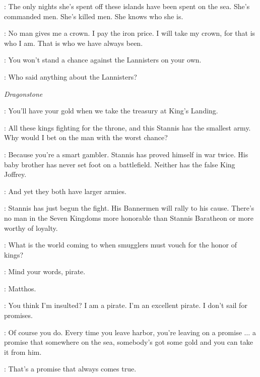 \BALON: The only nights she's spent off these islands have been spent on the sea. She's commanded men. She's killed men. She knows who she is.


\BALON: No man gives me a crown. I pay the iron price. I will take my crown, for that is who I am. That is who we have always been.


\THEON: You won't stand a chance against the Lannisters on your own.

\BALON: Who said anything about the Lannisters?


\scene

\textit{Dragonstone}


\DAVOS: You'll have your gold when we take the treasury at King's Landing.

\SALLADHOR: All these kings fighting for the throne, and this Stannis has the smallest army. Why would I bet on the man with the worst chance?

\DAVOS: Because you're a smart gambler. Stannis has proved himself in war twice. His baby brother has never set foot on a battlefield. Neither has the false King Joffrey.

\SALLADHOR: And yet they both have larger armies.

\DAVOS: Stannis has just begun the fight. His Bannermen will rally to his cause. There's no man in the Seven Kingdoms more honorable than Stannis Baratheon or more worthy of loyalty.

\SALLADHOR: What is the world coming to when smugglers must vouch for the honor of kings?

\MATTHOS: Mind your words, pirate.

\DAVOS: Matthos.

\SALLADHOR: You think I'm insulted? I am a pirate. I'm an excellent pirate. I don't sail for promises.

\DAVOS: Of course you do. Every time you leave harbor, you're leaving on a promise $\ldots$ a promise that somewhere on the sea, somebody's got some gold and you can take it from him.

\SALLADHOR: That's a promise that always comes true.


